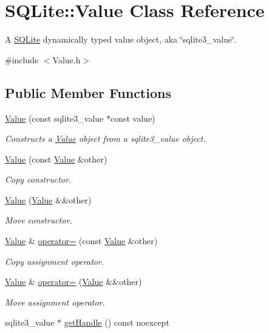 \hypertarget{a00015}{\section{S\-Q\-Lite\-:\-:Value Class Reference}
\label{a00015}
}


A \hyperlink{a00038}{S\-Q\-Lite} dynamically typed value object, aka \char`\"{}sqlite3\-\_\-value\char`\"{}.  




{\ttfamily \#include $<$Value.\-h$>$}

\subsection*{Public Member Functions}
\begin{DoxyCompactItemize}
\item 
\hyperlink{a00015_ace0be7092c23d5e3f4312db057d86997}{Value} (const sqlite3\-\_\-value $\ast$const value)
\begin{DoxyCompactList}\small\item\em Constructs a \hyperlink{a00015}{Value} object from a sqlite3\-\_\-value object. \end{DoxyCompactList}\item 
\hyperlink{a00015_acd6e10f2a509c8a0be20237d4b3a0fc7}{Value} (const \hyperlink{a00015}{Value} \&other)
\begin{DoxyCompactList}\small\item\em Copy constructor. \end{DoxyCompactList}\item 
\hyperlink{a00015_a531d4f514b9abe1eb1f47a277737b953}{Value} (\hyperlink{a00015}{Value} \&\&other)
\begin{DoxyCompactList}\small\item\em Move constructor. \end{DoxyCompactList}\item 
\hyperlink{a00015}{Value} \& \hyperlink{a00015_a879c07032f32606d277a8f6581a13abf}{operator=} (const \hyperlink{a00015}{Value} \&other)
\begin{DoxyCompactList}\small\item\em Copy assignment operator. \end{DoxyCompactList}\item 
\hyperlink{a00015}{Value} \& \hyperlink{a00015_ab80d7cf9eb8a462b23459d0fbba80277}{operator=} (\hyperlink{a00015}{Value} \&\&other)
\begin{DoxyCompactList}\small\item\em Move assignment operator. \end{DoxyCompactList}\item 
\hypertarget{a00015_adc0c8d347cbd6dbbd38c85ff755c9100}{sqlite3\-\_\-value $\ast$ \hyperlink{a00015_adc0c8d347cbd6dbbd38c85ff755c9100}{get\-Handle} () const noexcept}\label{a00015_adc0c8d347cbd6dbbd38c85ff755c9100}


\end{DoxyCompactItemize}
